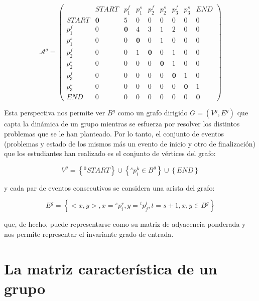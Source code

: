\begin{equation}\label{eq:matrix}
\mathcal{A}^g = 
\left(
\begin{array}{c|cccccccc}
    & START & p_1^f & p_1^s & p_2^f & p_2^s & p_3^f & p_3^s & END \\
  \hline
  START & \textbf{0} & 5 & 0 & 0 & 0 & 0 & 0 & 0 \\
  p_1^f & 0 & \textbf{0} & 4 & 3 & 1 & 2 & 0 & 0 \\
  p_1^s & 0 & 0 & \textbf{0} & 0 & 1 & 0 & 0 & 0 \\
  p_2^f & 0 & 0 & 1 & \textbf{0} & 0 & 1 & 0 & 0 \\
  p_2^s & 0 & 0 & 0 & 0 & \textbf{0} & 1 & 0 & 0 \\
  p_3^f & 0 & 0 & 0 & 0 & 0 & \textbf{0} & 1 & 0\\
  p_3^s & 0 & 0 & 0 & 0 & 0 & 0 & \textbf{0} & 1 \\
  END & 0 & 0 & 0 & 0 & 0 & 0 & 0 & \textbf{0}
\end{array}
\right)
\end{equation}

Esta perspectiva nos permite ver $B^g$ como un grafo dirigido $G = (V^g,E^g)$ que capta la dinámica de un grupo mientras se esfuerza por resolver los distintos problemas que se le han planteado. Por lo tanto, el conjunto de eventos (problemas y estado de los mismos más un evento de inicio y otro de finalización) que los estudiantes han realizado es el conjunto de vértices del grafo:

\begin{equation}
V^g = \left\lbrace ^0START \right\rbrace \cup \left\lbrace ^sp_i^k \in B^g \right\rbrace \cup \left\lbrace END \right\rbrace
\end{equation}

y cada par de eventos consecutivos se considera una arista del grafo:

\begin{equation}
E^g = \left\lbrace <x,y>, x = {}^sp_i^r, y = {}^tp_j^l, t = s+1, x,y \in B^g\right\rbrace
\end{equation}

que, de hecho, puede representarse como su matriz de adyacencia ponderada y nos permite representar el invariante grado de entrada.

\section{La matriz característica de un grupo}

